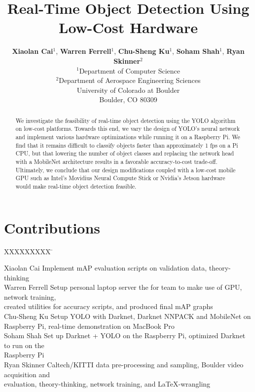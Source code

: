 \documentclass{article}
\title{Real-Time Object Detection Using Low-Cost Hardware}
\author{
    \textbf{Xiaolan Cai}$^\text{1}$, 
    \textbf{Warren Ferrell}$^\text{1}$,
    \textbf{Chu-Sheng Ku}$^\text{1}$,
    \textbf{Soham Shah}$^\text{1}$,
    \textbf{Ryan Skinner}$^\text{2}$
    \\
    $^\text{1}$Department of Computer Science\\
    $^\text{2}$Department of Aerospace Engineering Sciences\\
    University of Colorado at Boulder\\
    Boulder, CO 80309
}
\begin{document}

\maketitle
\begin{abstract}
We investigate the feasibility of real-time object detection using the YOLO algorithm on low-cost platforms. Towards this end, we vary the design of YOLO's neural network and implement various hardware optimizations while running it on a Raspberry Pi. We find that it remains difficult to classify objects faster than approximately 1 fps on a Pi CPU, but that lowering the number of object classes and replacing the network head with a MobileNet architecture results in a favorable accuracy-to-cost trade-off. Ultimately, we conclude that our design modifications coupled with a low-cost mobile GPU such as Intel's Movidius Neural Compute Stick or Nvidia's Jetson hardware would make real-time object detection feasible.
\end{abstract}

\section*{Contributions}
\begin{tabbing}
XXXXXXXXX \= \kill%

Xiaolan Cai \> Implement mAP evaluation scripts on validation data, theory-thinking\\

Warren Ferrell \> Setup personal laptop server the for team to make use of GPU, network training,\\ \> created utilities for accuracy scripts, and produced final mAP graphs \\

Chu-Sheng Ku \> Setup YOLO with Darknet, Darknet NNPACK and MobileNet on \\ \> Raspberry Pi, real-time demonstration on MacBook Pro\\

Soham Shah \> Set up Darknet + YOLO on the Raspberry Pi, optimized Darknet to run on the\\ \> Raspberry Pi\\

Ryan Skinner \> Caltech/KITTI data pre-processing and sampling, Boulder video acquisition and\\ \> evaluation, theory-thinking, network training, and \LaTeX-wrangling
\end{tabbing}
\end{document}
